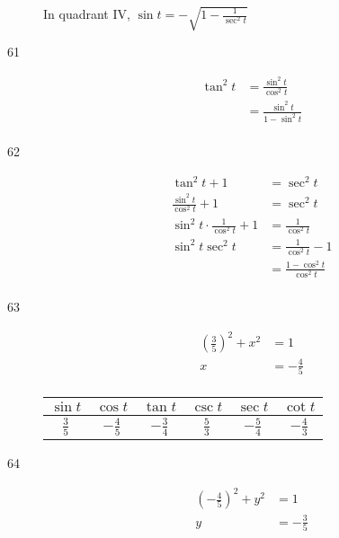 \documentclass{exam}
\begin{document}
\begin{description}
        In quadrant IV, $\sin t = \boxed{ - \sqrt{ 1 - \frac{1}{\sec^2 t} } }$ 

      \item[61] 
        \begin{align*}
          \tan^2 t & = \frac{\sin^2 t}{\cos^2 t} \\
                   & = \boxed{ \frac{\sin^2 t}{1 - \sin^2 t} } \\
        \end{align*}

      \item[62] 
        \begin{align*}
          \tan^2 t + 1                          & = \sec^2 t \\
          \frac{\sin^2 t}{\cos^2 t} + 1         & = \sec^2 t \\
          \sin^2 t \cdot \frac{1}{\cos^2 t} + 1 & = \frac{1}{\cos^2 t} \\
          \sin^2 t \sec^2 t                     & = \frac{1}{\cos^2 t} - 1 \\
                                                & = \boxed{ \frac{1 - \cos^2 t}{\cos^2 t} } \\
        \end{align*}

      \item[63]
        \begin{align*}
          \left( \frac{3}{5} \right)^2 + x^2 & = 1 \\
          x                                  & = -\frac{4}{5} \\
        \end{align*}

        \begin{tabular}[H]{cccccc}
          \toprule
          $\sin t$      & $\cos t$        & $\tan t$        & $\csc t$      & $\sec t$        & $\cot t$ \\
          \midrule
          $\frac{3}{5}$ & $- \frac{4}{5}$ & $- \frac{3}{4}$ & $\frac{5}{3}$ & $- \frac{5}{4}$ & $- \frac{4}{3}$ \\
          \bottomrule
        \end{tabular}

      \pagebreak

      \item[64]
        \begin{align*}
          \left( - \frac{4}{5} \right)^2 + y^2 & = 1 \\
          y                                    & = -\frac{3}{5} \\
        \end{align*}


\end{description}
\end{document}
